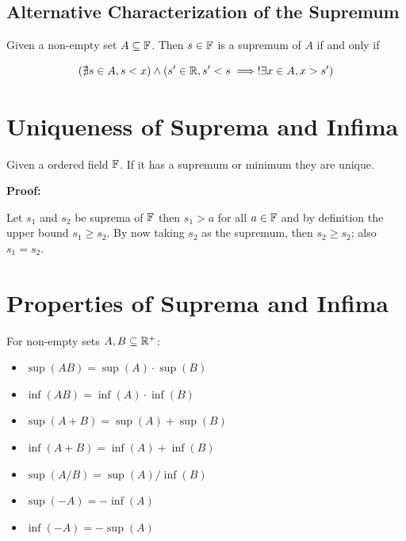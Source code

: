 \QED

\subsection{Alternative Characterization of the Supremum}

Given a non-empty set \(A \subseteq \mathbb{F}\). Then \(s \in \mathbb{F}\) is a supremum of \(A\) if and only if

\[
	(\nexists s \in A, s < x) \land (s' \in \mathbb{R}, s' < s \implies !\exists x \in A, x > s')
\]

\section{Uniqueness of Suprema and Infima}

Given a ordered field \(\mathbb{F}\). If it has a supremum or minimum they are unique.

\textbf{Proof:}

Let \(s_1\) and \(s_2\) be suprema of \(\mathbb{F}\) then \(s_1 > a\) for all \(a \in \mathbb{F}\) and by definition the upper bound \(s_1 \ge s_2\). By now taking
\(s_2\) as the supremum, then \(s_2 \ge s_2\); also \(s_1 = s_2\).

\section{Properties of Suprema and Infima}

For non-empty sets \(A, B \subseteq \mathbb{R}^+\):

\begin{itemize}

	\item \(\sup(AB) = \sup(A) \cdot \sup(B)\)

	\item \(\inf(AB) = \inf(A) \cdot \inf(B)\)

	\item \(\sup (A + B) = \sup(A) + \sup(B) \)

	\item \(\inf (A + B) = \inf(A) + \inf(B) \)

	\item \(\sup (A / B) = \sup(A) / \inf(B)\)

	\item \(\sup (-A) = - \inf (A)\)

	\item \(\inf (-A) = - \sup (A)\)

\end{itemize}

